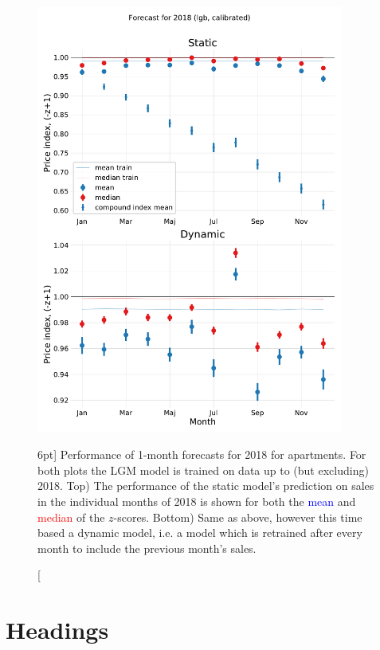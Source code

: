 \documentclass[a4paper, twoside]{tufte-book}
\begin{document}
\begin{figure}
  \includegraphics[width=0.9\textwidth, trim=0 0 0 70, clip]{figures/housing/Ejerlejlighed_v17_cut_all_Ncols_all__lgb_forecast_prediction_2018.pdf}
  \caption[2018 LGB Forecast][6pt]
          {Performance of 1-month forecasts for 2018 for apartments. For both plots the LGM model is trained on data up to (but excluding) 2018. Top) The performance of the static model's prediction on sales in the individual months of 2018 is shown for both the \textcolor{blue}{mean} and \textcolor{red}{median} of the $z$-scores. Bottom) Same as above, however this time based a dynamic model, i.e. a model which is retrained after every month to include the previous month's sales.
          } 
  \label{fig:h:forecast_2018_lgb}
\end{figure}









\section{Headings}\label{sec:headings1}
\end{document}
